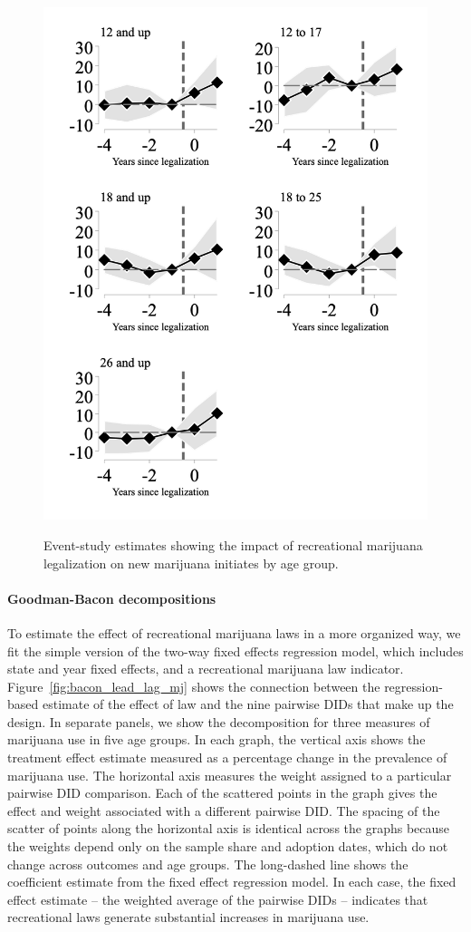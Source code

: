 \documentclass[12pt]{article}%
\begin{document}
\begin{figure}[h]
    \caption{Event-study estimates showing the impact of recreational marijuana legalization on new marijuana initiates by age group.}
    \includegraphics[width=.75\linewidth]{../output/plots/figure_4.png}
    \label{fig:leads-and-lags-mj-first-use}
\end{figure}

\paragraph{Goodman-Bacon decompositions}
To estimate the effect of recreational marijuana laws in a more organized way, we fit the simple version of the two-way fixed effects regression model, which includes state and year fixed effects, and a recreational marijuana law indicator. 
Figure~\ref{fig:bacon_lead_lag_mj} shows the connection between the regression-based estimate of the effect of law and the nine pairwise DIDs that make up the design. 
In separate panels, we show the decomposition for three measures of marijuana use in five age groups.  In each graph, the vertical axis shows the treatment effect estimate measured as a percentage change in the prevalence of marijuana use. The horizontal axis measures the weight assigned to a particular pairwise DID comparison. Each of the scattered points in the graph gives the effect and weight associated with a different pairwise DID. The spacing of the scatter of points along the horizontal axis is identical across the graphs because the weights depend only on the sample share and adoption dates, which do not change across outcomes and age groups. The long-dashed line shows the coefficient estimate from the fixed effect regression model.
In each case, the fixed effect estimate – the weighted average of the pairwise DIDs – indicates that recreational laws generate substantial increases in marijuana use.
\end{document}
